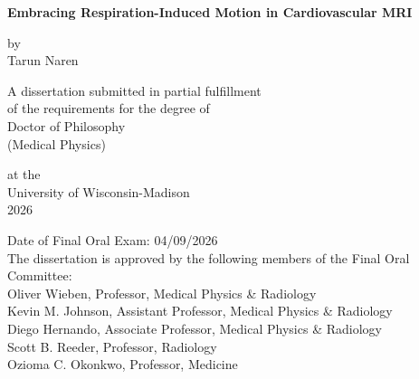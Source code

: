 \begin{titlepage}
    \begin{center}
        \vspace*{1cm}
        
        \LARGE
        \textbf{Embracing Respiration-Induced Motion in Cardiovascular MRI}
        
        \vspace{0.5cm}
        \LARGE
        by\\
    
        Tarun Naren \\
        
        \vfill
        
        \Large
        A dissertation submitted in partial fulfillment\\
        of the requirements for the degree of\\
        Doctor of Philosophy\\
        (Medical Physics)\\
    
        
        \vspace{1.8cm}

        
        \Large
        at the\\University of Wisconsin-Madison\\
        2026\\
        \vspace{1.0cm}
        \begin{flushleft}
        \small
        Date of Final Oral Exam:  04/09/2026\\
        The dissertation is approved by the following members of the Final Oral Committee: \\
        \setlength{\parindent}{10ex}
        Oliver Wieben, Professor, Medical Physics \& Radiology\\
        Kevin M. Johnson, Assistant Professor, Medical Physics \& Radiology\\
        Diego Hernando, Associate Professor, Medical Physics \& Radiology\\
        Scott B. Reeder, Professor, Radiology\\
        Ozioma C. Okonkwo, Professor, Medicine\\
        \end{flushleft}
        
    \end{center}
    
\end{titlepage}